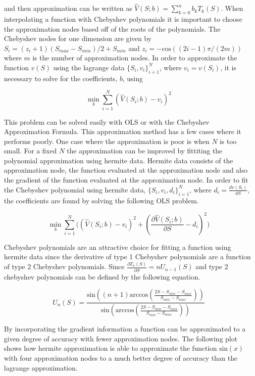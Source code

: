 \documentclass[12pt]{article}
\begin{document}
and then approximation can be written as $\hat{V}(S;b)=\sum_{k=0}^n b_k T_k(S)$.
When interpolating a function with Chebyshev polynomials it is important to choose the approximation nodes based off of the roots of the polynomials. The Chebyshev nodes for one dimension are given by $S_i=(z_i+1)(S_{max}-S_{min})/2+S_{min}$ and $z_i=-\text{cos}((2i-1)\pi/(2m))$ where $m$ is the number of approximation nodes. In order to approximate the function $v(S)$ using the lagrange data $\{S_i,v_i\}_{i=1}^N$, where $v_i=v(S_i)$, it is necessary to solve for the coefficients, $b$, using

\begin{equation*}
  \min_b \sum_{i=1}^N (\hat{V}(S_i;b)-v_i)^2
\end{equation*}

This problem can be solved easily with OLS or with the Chebyshev Approximation Formula. This approximation method has a few cases where it performs poorly. One case where the approximation is poor is when $N$ is too small. For a fixed $N$ the approximation can be improved by fittiting the polynomial approximation using hermite data. Hermite data consists of the approximation node, the function evaluated at the approximation node and also the gradient of the function evaluated at the approximation node. In order to fit the Chebyshev polynomial using hermite data, $\{S_i,v_i,d_i\}_{i=1}^N$, where $d_i=\frac{d v(S_i)}{d S}$, the coefficients are found by solving the following OLS problem.

\begin{equation*}
  \min_b \sum_{i=1}^N\bigg((\hat{V}(S_i;b)-v_i)^2 + (\frac{\partial \hat{V}(S_i;b)}{\partial S} - d_i)^2 \bigg)
\end{equation*}

Chebyshev polynomials are an attractive choice for fitting a function using hermite data since the derivative of type 1 Chebyshev polynomials are a function of type 2 Chebyshev polynomials. Since $\frac{\partial T_n(S)}{\partial S} = n U_{n-1}(S)$ and type 2 chebyshev polynomials can be defined by the following equation.

\begin{equation*}
  U_n(S) = \frac{\text{sin}((n+1) \text{arccos}(\frac{2S-S_{min}-S_{max}}{S_{min}-S_{max}}))}{\text{sin}(\text{arccos}(\frac{2S-S_{min}-S_{max}}{S_{min}-S_{max}}))}
\end{equation*}

By incorporating the gradient information a function can be approximated to a given degree of accuracy with fewer approximation nodes. The following plot shows how hermite approximation is able to approximate the function $\text{sin}(x)$ with four approximation nodes to a much better degree of accuracy than the lagrange approximation.
\end{document}
